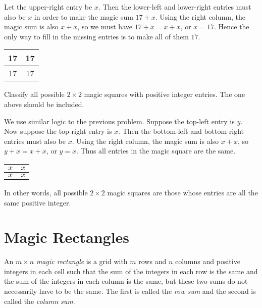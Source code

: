 \documentclass[11pt]{article}
\renewenvironment{problem}{\begin{problems}}{\end{problems}\vspace{5pt}}
\begin{document}
\begin{solution}
Let the upper-right entry be $x$. Then the lower-left and lower-right entries must also be $x$ in order
to make the magic sum $17+x$. Using the right column, the magic sum is also $x+x$, so we must have
$17+x = x+x$, or $x = 17$. Hence the only way to fill in the missing entries is to make all of them $17$.

\begin{center}
\begin{tabular}{|c|c|}
\hline
17 & 17 \\ \hline
17 & 17 \\ \hline
\end{tabular}
\end{center}
\end{solution}

\begin{problem}[4 points]
Classify all possible $2 \times 2$ magic squares with positive integer entries. The one above should be included.
\end{problem}

\begin{solution}
We use similar logic to the previous problem. Suppose the top-left entry is $y$. 
Now suppose the top-right entry is $x$. Then the bottom-left and bottom-right entries must also be $x$.
Using the right column, the magic sum is also $x+x$, so $y+x = x+x$, or $y = x$.
Thus all entries in the magic square are the same.

\begin{center}
\begin{tabular}{|c|c|}
\hline
$x$ & $x$ \\ \hline
$x$ & $x$ \\ \hline
\end{tabular}
\end{center}

In other words, all possible $2 \times 2$ magic squares are those whose entries are all the same positive integer.
\end{solution}

\section{Magic Rectangles}

\begin{definition}
An $m \times n$ \textit{magic rectangle} is a grid with $m$ rows and $n$ columns and positive integers in each cell such that
the sum of the integers in each row is the same and the sum of the integers in each column is the same,
but these two sums do not necessarily have to be the same.
The first is called the \textit{row sum} and the second is called the \textit{column sum}.
\end{definition}
\end{document}
